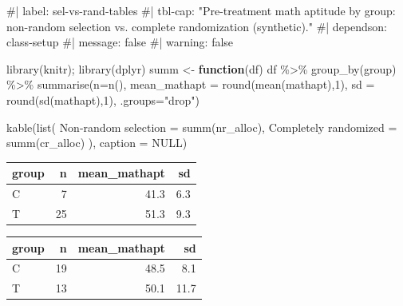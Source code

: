 \documentclass[
  letterpaper,
  DIV=11,
  numbers=noendperiod]{scrreprt}
\newenvironment{Shaded}{\begin{snugshade}}{\end{snugshade}}
\newcommand{\AttributeTok}[1]{\textcolor[rgb]{0.40,0.45,0.13}{#1}}
\newcommand{\CommentTok}[1]{\textcolor[rgb]{0.37,0.37,0.37}{#1}}
\newcommand{\ConstantTok}[1]{\textcolor[rgb]{0.56,0.35,0.01}{#1}}
\newcommand{\ControlFlowTok}[1]{\textcolor[rgb]{0.00,0.23,0.31}{\textbf{#1}}}
\newcommand{\DecValTok}[1]{\textcolor[rgb]{0.68,0.00,0.00}{#1}}
\newcommand{\FunctionTok}[1]{\textcolor[rgb]{0.28,0.35,0.67}{#1}}
\newcommand{\NormalTok}[1]{\textcolor[rgb]{0.00,0.23,0.31}{#1}}
\newcommand{\OtherTok}[1]{\textcolor[rgb]{0.00,0.23,0.31}{#1}}
\newcommand{\SpecialCharTok}[1]{\textcolor[rgb]{0.37,0.37,0.37}{#1}}
\newcommand{\StringTok}[1]{\textcolor[rgb]{0.13,0.47,0.30}{#1}}
\begin{document}
\begin{Shaded}
\begin{Highlighting}[]
\CommentTok{\#| label: sel{-}vs{-}rand{-}tables}
\CommentTok{\#| tbl{-}cap: "Pre{-}treatment math aptitude by group: non{-}random selection vs. complete randomization (synthetic)."}
\CommentTok{\#| dependson: class{-}setup}
\CommentTok{\#| message: false}
\CommentTok{\#| warning: false}

\FunctionTok{library}\NormalTok{(knitr); }\FunctionTok{library}\NormalTok{(dplyr)}
\NormalTok{summ }\OtherTok{\textless{}{-}} \ControlFlowTok{function}\NormalTok{(df) df }\SpecialCharTok{\%\textgreater{}\%} \FunctionTok{group\_by}\NormalTok{(group) }\SpecialCharTok{\%\textgreater{}\%}
  \FunctionTok{summarise}\NormalTok{(}\AttributeTok{n=}\FunctionTok{n}\NormalTok{(), }\AttributeTok{mean\_mathapt =} \FunctionTok{round}\NormalTok{(}\FunctionTok{mean}\NormalTok{(mathapt),}\DecValTok{1}\NormalTok{),}
            \AttributeTok{sd =} \FunctionTok{round}\NormalTok{(}\FunctionTok{sd}\NormalTok{(mathapt),}\DecValTok{1}\NormalTok{), }\AttributeTok{.groups=}\StringTok{"drop"}\NormalTok{)}

\FunctionTok{kable}\NormalTok{(}\FunctionTok{list}\NormalTok{(}
  \StringTok{\textasciigrave{}}\AttributeTok{Non{-}random selection}\StringTok{\textasciigrave{}} \OtherTok{=} \FunctionTok{summ}\NormalTok{(nr\_alloc),}
  \StringTok{\textasciigrave{}}\AttributeTok{Completely randomized}\StringTok{\textasciigrave{}} \OtherTok{=} \FunctionTok{summ}\NormalTok{(cr\_alloc)}
\NormalTok{), }\AttributeTok{caption =} \ConstantTok{NULL}\NormalTok{)}
\end{Highlighting}
\end{Shaded}

\begin{table}

\centering
\begin{tabular}[t]{l|r|r|r}
\hline
group & n & mean\_mathapt & sd\\
\hline
C & 7 & 41.3 & 6.3\\
\hline
T & 25 & 51.3 & 9.3\\
\hline
\end{tabular}
\centering
\begin{tabular}[t]{l|r|r|r}
\hline
group & n & mean\_mathapt & sd\\
\hline
C & 19 & 48.5 & 8.1\\
\hline
T & 13 & 50.1 & 11.7\\
\hline
\end{tabular}
\end{table}
\end{document}
